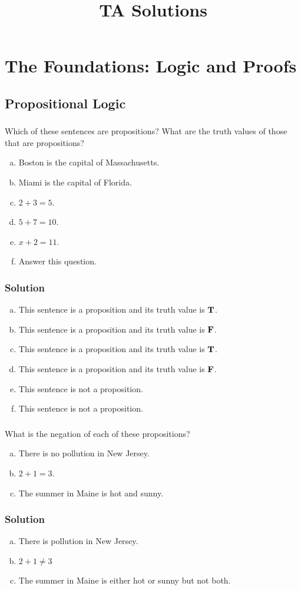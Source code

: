 \documentclass[11pt,a4paper]{article}
\newcommand{\chapter}[2]{%
\setcounter{section}{#1}%
\addtocounter{section}{-1}%
\section{#2}%
}
\newcommand{\subchapter}[2]{%
\setcounter{subsection}{#1}%
\addtocounter{subsection}{-1}%
\subsection{#2}%
}
\newcommand{\problem}[1]{%
\setcounter{subsubsection}{#1}%
\addtocounter{subsubsection}{-1}%
\subsubsection{\hfill}%
}
\newcommand{\solution}{%
\subsubsection*{Solution}%
}
\DeclareMathOperator{\T}{\text{\textbf T}}
\DeclareMathOperator{\F}{\text{\textbf F}}
\begin{document}
\title{TA Solutions}
\date{}
\author{}
\maketitle

\chapter{1}{The Foundations: Logic and Proofs}
	\subchapter{1}{Propositional Logic}
		\problem{1}
			Which of these sentences are propositions?
			What are the truth values of those that are propositions?
			\begin{enumerate}[a)]
				\item Boston is the capital of Massachusetts.
				\item Miami is the capital of Florida.
				\item $2 + 3 = 5$.
				\item $5 + 7 = 10$.
				\item $x + 2 = 11$.
				\item Answer this question.
			\end{enumerate}
		\solution{}
			\begin{enumerate}[a)]
				\item This sentence is a proposition and its truth value is $\T$.
				\item This sentence is a proposition and its truth value is $\F$.
				\item This sentence is a proposition and its truth value is $\T$.
				\item This sentence is a proposition and its truth value is $\F$.
				\item This sentence is not a proposition.
				\item This sentence is not a proposition.
			\end{enumerate}
		\problem{3}
			What is the negation of each of these propositions?
			\begin{enumerate}[a)]
				\addtocounter{enumi}{1}
				\item There is no pollution in New Jersey.
				\item $2 + 1 = 3$.
				\item The summer in Maine is hot and sunny.
			\end{enumerate}
		\solution{}
			\begin{enumerate}[a)]
				\addtocounter{enumi}{1}
				\item There is pollution in New Jersey.
				\item $2 + 1 \neq 3$
				\item The summer in Maine is either hot or sunny but not both.
			\end{enumerate}
\end{document}
